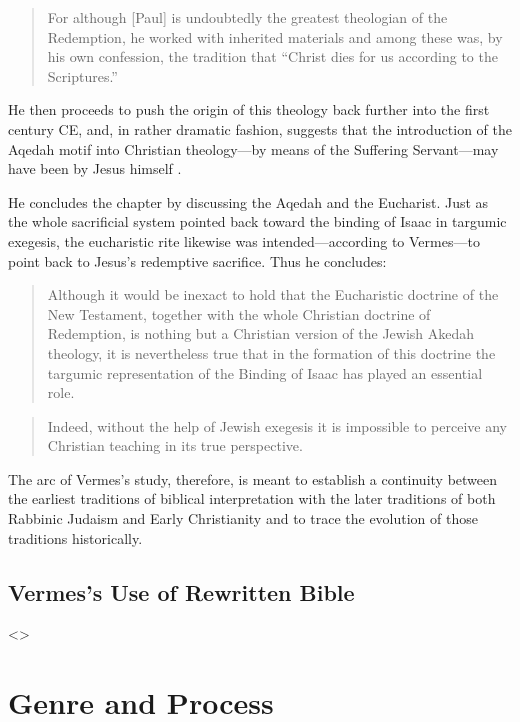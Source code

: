 \begin{quote}
For although {[}Paul{]} is undoubtedly the greatest theologian of the
Redemption, he worked with inherited materials and among these was, by
his own confession, the tradition that ``Christ dies for us according to
the Scriptures.''\autocite[221]{vermes1961}
\end{quote}

He then proceeds to push the origin of this theology back further into
the first century CE, and, in rather dramatic fashion, suggests that the
introduction of the Aqedah motif into Christian theology---by means of
the Suffering Servant---may have been by Jesus himself
\autocite[223]{vermes1961}.

He concludes the chapter by discussing the Aqedah and the Eucharist.
Just as the whole sacrificial system pointed back toward the binding of
Isaac in targumic exegesis, the eucharistic rite likewise was
intended---according to Vermes---to point back to Jesus's redemptive
sacrifice. Thus he concludes:

\begin{quote}
Although it would be inexact to hold that the Eucharistic doctrine of
the New Testament, together with the whole Christian doctrine of
Redemption, is nothing but a Christian version of the Jewish Akedah
theology, it is nevertheless true that in the formation of this doctrine
the targumic representation of the Binding of Isaac has played an
essential role.
\end{quote}

\begin{quote}
Indeed, without the help of Jewish exegesis it is impossible to perceive
any Christian teaching in its true
perspective.\autocite[227]{vermes1961}
\end{quote}

The arc of Vermes's study, therefore, is meant to establish a continuity
between the earliest traditions of biblical interpretation with the
later traditions of both Rabbinic Judaism and Early Christianity and to
trace the evolution of those traditions historically.

\subsection{Vermes's Use of Rewritten
Bible}\label{vermess-use-of-rewritten-bible}

\textless{}\textgreater{}

\section{Genre and Process}\label{genre-and-process}

